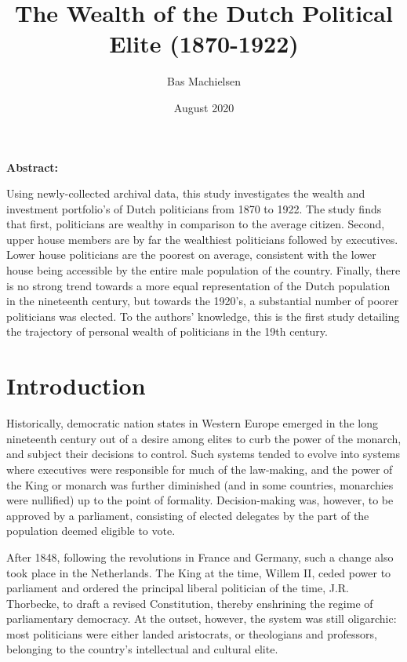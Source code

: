 
\usepackage[utf8]{inputenc}

\title{The Wealth of the Dutch Political Elite (1870-1922)}
\author{Bas Machielsen}
\date{August 2020}



\maketitle

\begin{center}
\textbf{Abstract:}
\end{center}
Using newly-collected archival data, this study investigates the wealth and investment portfolio's of Dutch politicians from 1870 to 1922. The study finds that first, politicians are wealthy in comparison to the average citizen. Second, upper house members are by far the wealthiest politicians followed by executives. Lower house politicians are the poorest on average, consistent with the lower house being accessible by the entire male population of the country. Finally, there is no strong trend towards a more equal representation of the Dutch population in the nineteenth century, but towards the 1920's, a substantial number of poorer politicians was elected. To the authors' knowledge, this is the first study detailing the trajectory of personal wealth of politicians in the 19th century.
\clearpage

\section{Introduction}
Historically, democratic nation states in Western Europe emerged in the long nineteenth century out of a desire among elites to curb the power of the monarch, and subject their decisions to control. Such systems tended to evolve into systems where executives were responsible for much of the law-making, and the power of the King or monarch was further diminished (and in some countries, monarchies were nullified) up to the point of formality. Decision-making was, however, to be approved by a parliament, consisting of elected delegates by the part of the population deemed eligible to vote. 

After 1848, following the revolutions in France and Germany, such a change also took place in the Netherlands. The King at the time, Willem II, ceded power to parliament and ordered the principal liberal politician of the time, J.R. Thorbecke, to draft a revised Constitution, thereby enshrining the regime of parliamentary democracy. At the outset, however, the system was still oligarchic: most politicians were either landed aristocrats, or theologians and professors, belonging to the country's intellectual and cultural elite. 

